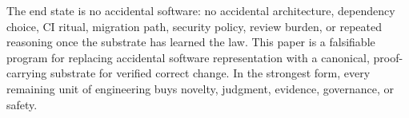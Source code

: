 The end state is no accidental software: no accidental architecture, dependency choice, CI ritual, migration path, security policy, review burden, or repeated reasoning once the substrate has learned the law. This paper is a falsifiable program for replacing accidental software representation with a canonical, proof-carrying substrate for verified correct change. In the strongest form, every remaining unit of engineering buys novelty, judgment, evidence, governance, or safety.

